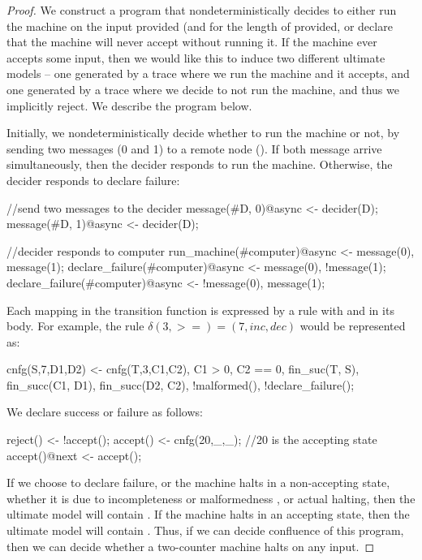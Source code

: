 \begin{proof}
We construct a \lang program that nondeterministically decides to either run the machine on the input provided (and for the length of  provided, or declare that the machine will never accept without running it.  If the machine ever accepts some input, then we would like this to induce two different ultimate models -- one generated by a trace where we run the machine and it accepts, and one generated by a trace where we decide to not run the machine, and thus we implicitly reject.  We describe the program below. 

Initially, we nondeterministically decide whether to run the machine or not, by sending two messages (0 and 1) to a remote node ().  If both message arrive simultaneously, then the decider responds to run the machine.  Otherwise, the decider responds to declare failure:

\begin{Dedalus}
//send two messages to the decider
message(#D, 0)@async <- decider(D);
message(#D, 1)@async <- decider(D);

//decider responds to computer
run_machine(#computer)@async <- message(0),
                                message(1);
declare_failure(#computer)@async <- message(0),
                                    !message(1);
declare_failure(#computer)@async <- !message(0),
                                    message(1);
\end{Dedalus}

Each mapping in the transition function is expressed by a \lang rule with  and  in its body.  For example, the rule $\delta(3, > =) = (7, inc, dec)$ would be represented as:

\begin{Dedalus}
cnfg(S,7,D1,D2) <- cnfg(T,3,C1,C2), C1 > 0, C2 == 0,
                   fin_suc(T, S), fin_succ(C1, D1),
                   fin_succ(D2, C2), !malformed(),
                   !declare_failure();
\end{Dedalus}

We declare success or failure as follows:

\begin{Dedalus}
reject() <- !accept();
accept() <- cnfg(20,_,_); //20 is the accepting state
accept()@next <- accept();
\end{Dedalus}

If we choose to declare failure, or the machine halts in a non-accepting state, whether it is due to incompleteness or malformedness , or actual halting, then the ultimate model will contain .  If the machine halts in an accepting state, then the ultimate model will contain .  Thus, if we can decide confluence of this program, then we can decide whether a two-counter machine halts on any input.
\end{proof}
